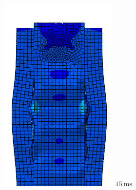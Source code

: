 \documentclass[
documentsize = a4, %
font = cmr, %
typesize = 11, %
printmode = true,
onehalfspacing = true,
language = en, %
titlepage = udciccp, %
degree = pt, %
dedication = true,
acknowledgements = true,
abstract-en = true,
abstract-es = false,
abstract-ga = false,
epigraphs = true,
toc = true,
lof = true,
lot = true,
frontmatterintoc = false,
notation = false,
minimal = false,
]{UDCthesis}
\begin{document}
\begin{figure}
\begin{minipage}[b]{.15\linewidth}
		\includegraphics[width=\linewidth]{IMG_CUTRES/c5}
		$\SI{15}{\ms}$
	\end{minipage}
	\quad
	\begin{minipage}[b]{.15\linewidth}
		\centering

\end{minipage}
\end{figure}
\end{document}
